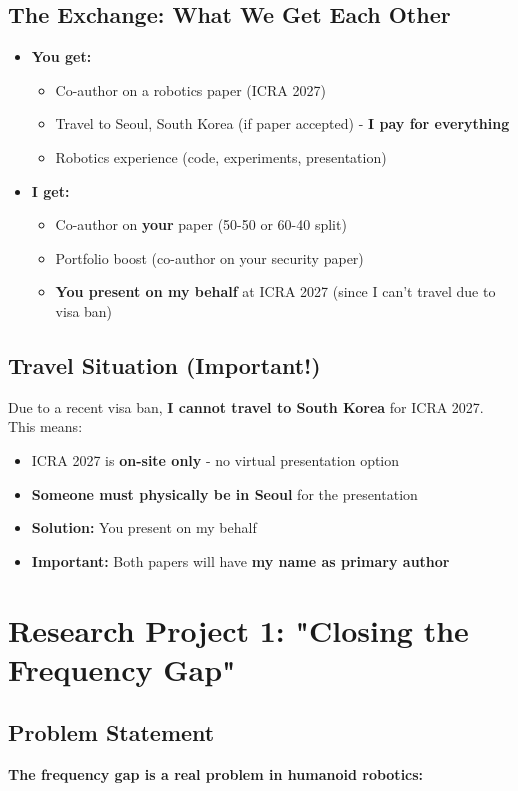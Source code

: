 \documentclass[11pt]{article}
\begin{document}
\subsection{The Exchange: What We Get Each Other}
\begin{itemize}
    \item \textbf{You get:}
    \begin{itemize}
        \item Co-author on a robotics paper (ICRA 2027)
        \item Travel to Seoul, South Korea (if paper accepted) - \textbf{I pay for everything}
        \item Robotics experience (code, experiments, presentation)
    \end{itemize}
    \item \textbf{I get:}
    \begin{itemize}
        \item Co-author on \textbf{your} paper (50-50 or 60-40 split)
        \item Portfolio boost (co-author on your security paper)
        \item \textbf{You present on my behalf} at ICRA 2027 (since I can't travel due to visa ban)
    \end{itemize}
\end{itemize}

\subsection{Travel Situation (Important!)}
Due to a recent visa ban, \textbf{I cannot travel to South Korea} for ICRA 2027. This means:
\begin{itemize}
    \item ICRA 2027 is \textbf{on-site only} - no virtual presentation option
    \item \textbf{Someone must physically be in Seoul} for the presentation
    \item \textbf{Solution:} You present on my behalf
    \item \textbf{Important:} Both papers will have \textbf{my name as primary author}
\end{itemize}

\section{Research Project 1: "Closing the Frequency Gap"}

\subsection{Problem Statement}
\textbf{The frequency gap is a real problem in humanoid robotics:}
\end{document}
